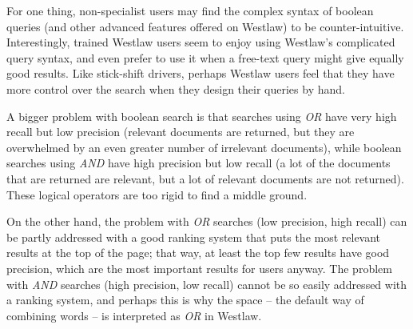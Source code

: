For one thing, non-specialist users may find the complex syntax of boolean queries (and other advanced features offered on Westlaw) to be counter-intuitive.  Interestingly, trained Westlaw users seem to  enjoy using Westlaw's complicated query syntax, and even prefer to use it when a free-text query might give equally good results.  Like stick-shift drivers, perhaps Westlaw users feel that they have more control over the search when they design their queries by hand.

A bigger problem with boolean search is that searches using \emph{OR} have very high recall but low precision (relevant documents are returned, but they are overwhelmed by an even greater number of irrelevant documents), while boolean searches using \emph{AND} have high precision but low recall (a lot of the documents that are returned are relevant, but a lot of relevant documents are not returned).  These logical operators are too rigid to find a middle ground.  

On the other hand, the problem with \emph{OR} searches (low precision, high recall) can be partly addressed with a good ranking system that puts the most relevant results at the top of the page; that way, at least the top few results have good precision, which are the most important results for users anyway.  The problem with \emph{AND} searches (high precision, low recall) cannot be so easily addressed with a ranking system, and perhaps this is why the space -- the default way of combining words -- is interpreted as \emph{OR}  in Westlaw.


